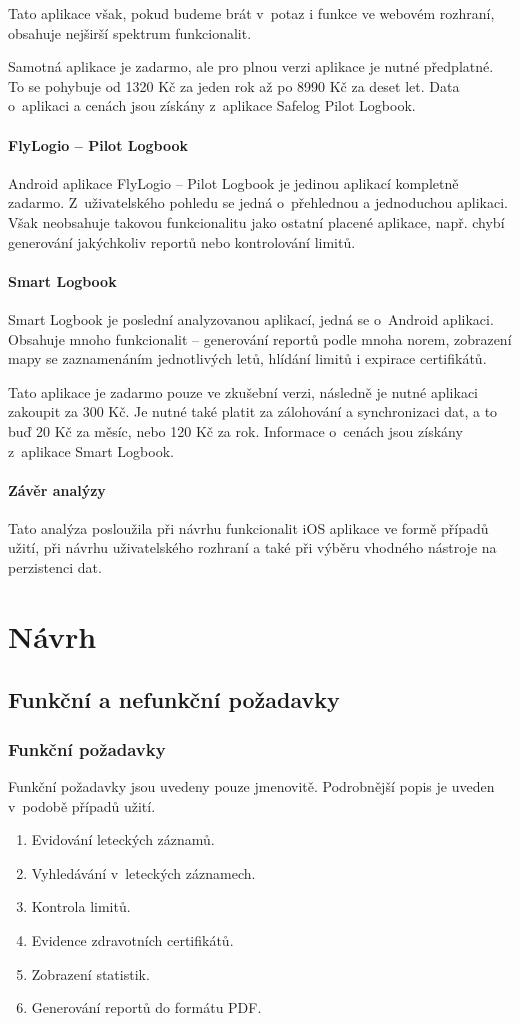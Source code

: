 \documentclass[thesis=M,czech]{FITthesis}[2012/06/26]
\begin{document}
Tato aplikace však, pokud budeme brát v~potaz i funkce ve webovém rozhraní, obsahuje nejširší spektrum funkcionalit.

Samotná aplikace je zadarmo, ale pro plnou verzi aplikace je nutné předplatné. To se pohybuje od 1320 Kč za jeden rok až po 8990 Kč za deset let. Data o~aplikaci a cenách jsou získány z~aplikace Safelog Pilot Logbook.

\subsubsection{FlyLogio -- Pilot Logbook}
Android aplikace FlyLogio -- Pilot Logbook je jedinou aplikací kompletně zadarmo. Z~uživatelského pohledu se jedná o~přehlednou a jednoduchou aplikaci.  Však neobsahuje takovou funkcionalitu jako ostatní placené aplikace, např. chybí generování jakýchkoliv reportů nebo kontrolování limitů.

\subsubsection{Smart Logbook}
Smart Logbook je poslední analyzovanou aplikací, jedná se o~Android aplikaci. Obsahuje mnoho funkcionalit -- generování reportů podle mnoha norem, zobrazení mapy se zaznamenáním jednotlivých letů, hlídání limitů i expirace certifikátů.

Tato aplikace je zadarmo pouze ve zkušební verzi, následně je nutné aplikaci zakoupit za 300 Kč. Je nutné také platit za zálohování a synchronizaci dat, a to buď 20 Kč za měsíc, nebo 120 Kč za rok. Informace o~cenách jsou získány z~aplikace Smart Logbook.

\subsubsection{Závěr analýzy}
Tato analýza posloužila při návrhu funkcionalit iOS aplikace ve formě případů užití, při návrhu uživatelského rozhraní a také při výběru vhodného nástroje na perzistenci dat.

\chapter{Návrh}

\section{Funkční a nefunkční požadavky}
\subsection{Funkční požadavky}
Funkční požadavky jsou uvedeny pouze jmenovitě. Podrobnější popis je uveden v~podobě případů užití.
\begin{enumerate}
\item Evidování leteckých záznamů.
\item Vyhledávání v~leteckých záznamech.
\item Kontrola limitů.
\item Evidence zdravotních certifikátů.
\item Zobrazení statistik.
\item Generování reportů do formátu PDF.
\end{enumerate}
\end{document}
